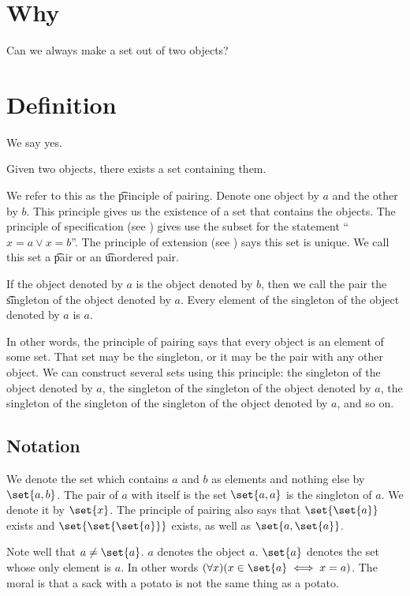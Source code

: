 
\section*{Why}

Can we always make a set out of two objects?

\section*{Definition}

We say yes.
\begin{principle}[Pairing]
Given two objects, there exists a set containing them.
\end{principle}

We refer to this as the \t{principle of pairing}.
Denote one object by $a$ and the other by $b$.
This principle gives us the existence of a set that contains the objects.
The principle of specification (see ) gives use the subset for the statement ``$x = a \lor x = b$''.
The principle of extension (see ) says this set is unique.
We call this set a \t{pair} or an \t{unordered pair}.

If the object denoted by $a$ is the object denoted by $b$, then we call the pair the \t{singleton} of the object denoted by $a$.
Every element of the singleton of the object denoted by $a$ is $a$.

In other words, the principle of pairing says that every object is an element of some set.
That set may be the singleton, or it may be the pair with any other object.
We can construct several sets using this principle: the singleton of the object denoted by $a$, the singleton of the singleton of the object denoted by $a$, the singleton of the singleton of the singleton of the object denoted by $a$, and so on.

\subsection*{Notation}

We denote the set which contains $a$ and $b$ as elements and nothing else by $\set{a, b}$.
The pair of $a$ with itself is the set $\set{a, a}$ is the singleton of $a$.
We denote it by $\set{x}$.
The principle of pairing also says that $\set{\set{a}}$ exists and $\set{\set{\set{a}}}$ exists, as well as $\set{a, \set{a}}$.

Note well that $a \neq \set{a}$.
$a$ denotes the object $a$.
$\set{a}$ denotes the set whose only element is $a$.
In other words $(\forall x)(x \in \set{a} \iff x = a)$.
The moral is that a sack with a potato is not the same thing as a potato.

